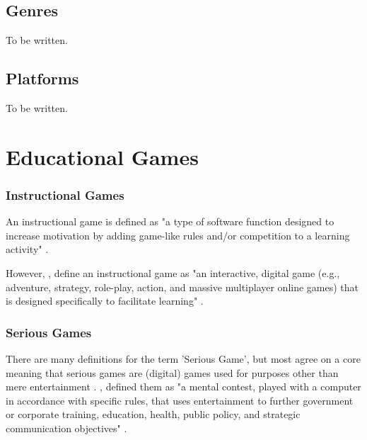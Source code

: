\documentclass[a4paper,11.5pt]{report}
\numberwithin{figure}{section}
\numberwithin{table}{section}
\numberwithin{equation}{section}
\numberwithin{equation}{section}
\begin{document}
\subsection{Genres}

To be written.

\subsection{Platforms}

To be written.

\section{Educational Games}

\subsubsection*{Instructional Games} %

An instructional game is defined as "a type of software function designed to increase motivation by adding game-like rules and/or competition to a learning activity" \cite{Roblyer2013}.

However, \citeauthor{AtsusiHirumi2010}, define an instructional game as "an interactive, digital game (e.g., adventure, strategy, role-play, action, and massive multiplayer online games) that is designed specifically to facilitate learning" \cite{AtsusiHirumi2010}.


\subsubsection*{Serious Games} %

There are many definitions for the term 'Serious Game', but most agree on a core meaning that serious games are (digital) games used for purposes other than mere entertainment \cite{Susi2416}. \citeauthor{Zyda2005}, defined them as "a mental contest, played with a computer in accordance with specific rules, that uses entertainment to further government or corporate training, education, health, public policy, and strategic communication objectives" \cite{Zyda2005}.
\end{document}
